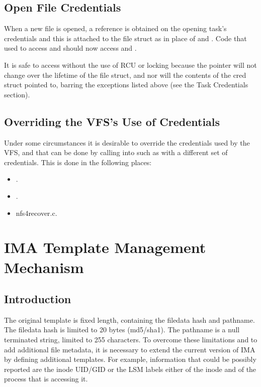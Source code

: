 \documentclass[a4paper,8pt,english]{sphinxmanual}
\begin{document}
\section{Open File Credentials}
\label{security/credentials:open-file-credentials}
When a new file is opened, a reference is obtained on the opening task's
credentials and this is attached to the file struct as  in place of
 and .  Code that used to access  and
 should now access  and
.

It is safe to access  without the use of RCU or locking because the
pointer will not change over the lifetime of the file struct, and nor will the
contents of the cred struct pointed to, barring the exceptions listed above
(see the Task Credentials section).


\section{Overriding the VFS's Use of Credentials}
\label{security/credentials:overriding-the-vfs-s-use-of-credentials}
Under some circumstances it is desirable to override the credentials used by
the VFS, and that can be done by calling into such as  with a
different set of credentials.  This is done in the following places:
\begin{itemize}
\item {} 
.

\item {} 
.

\item {} 
nfs4recover.c.

\end{itemize}


\chapter{IMA Template Management Mechanism}
\label{security/IMA-templates:ima-template-management-mechanism}\label{security/IMA-templates::doc}

\section{Introduction}
\label{security/IMA-templates:introduction}
The original  template is fixed length, containing the filedata hash
and pathname. The filedata hash is limited to 20 bytes (md5/sha1).
The pathname is a null terminated string, limited to 255 characters.
To overcome these limitations and to add additional file metadata, it is
necessary to extend the current version of IMA by defining additional
templates. For example, information that could be possibly reported are
the inode UID/GID or the LSM labels either of the inode and of the process
that is accessing it.
\end{document}
